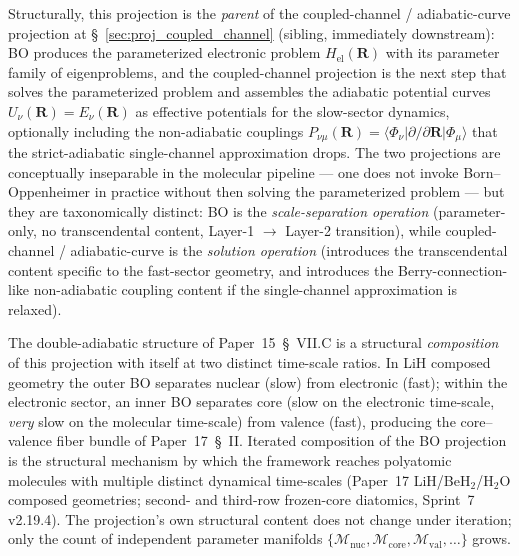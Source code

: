 Structurally, this projection is the \emph{parent} of the
coupled-channel / adiabatic-curve projection at
\S~\ref{sec:proj_coupled_channel} (sibling, immediately downstream):
BO produces the parameterized electronic problem $H_\text{el}(\bm{R})$
with its parameter family of eigenproblems, and the coupled-channel
projection is the next step that solves the parameterized problem
and assembles the adiabatic potential curves
$U_\nu(\bm{R}) = E_\nu(\bm{R})$ as effective potentials for the
slow-sector dynamics, optionally including the non-adiabatic
couplings $P_{\nu\mu}(\bm{R}) = \langle \Phi_\nu | \partial / \partial
\bm{R} | \Phi_\mu \rangle$ that the strict-adiabatic single-channel
approximation drops.  The two projections are conceptually
inseparable in the molecular pipeline --- one does not invoke
Born--Oppenheimer in practice without then solving the parameterized
problem --- but they are taxonomically distinct: BO is the
\emph{scale-separation operation} (parameter-only, no transcendental
content, Layer-1 $\to$ Layer-2 transition), while coupled-channel /
adiabatic-curve is the \emph{solution operation} (introduces the
transcendental content specific to the fast-sector geometry, and
introduces the Berry-connection-like non-adiabatic coupling content
if the single-channel approximation is relaxed).

The double-adiabatic structure of Paper~15~\S~VII.C is a structural
\emph{composition} of this projection with itself at two distinct
time-scale ratios.  In LiH composed geometry the outer BO separates
nuclear (slow) from electronic (fast); within the electronic sector,
an inner BO separates core (slow on the electronic time-scale,
\emph{very} slow on the molecular time-scale) from valence (fast),
producing the core--valence fiber bundle of Paper~17~\S~II.  Iterated
composition of the BO projection is the structural mechanism by
which the framework reaches polyatomic molecules with multiple
distinct dynamical time-scales (Paper~17 LiH/BeH$_2$/H$_2$O composed
geometries; second- and third-row frozen-core diatomics, Sprint~7
v2.19.4).  The projection's own structural content does not change
under iteration; only the count of independent parameter manifolds
$\{\mathcal{M}_\text{nuc}, \mathcal{M}_\text{core}, \mathcal{M}_\text{val},
\ldots\}$ grows.
